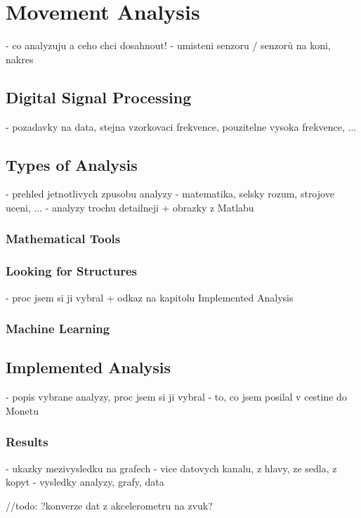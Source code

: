\chapter{Movement Analysis}
- co analyzuju a ceho chci dosahnout!
- umisteni senzoru / senzorů na koni, nakres

\section{Digital Signal Processing}
- pozadavky na data, stejna vzorkovaci frekvence, pouzitelne vysoka frekvence, ...

\section{Types of Analysis}
- prehled jetnotlivych zpusobu analyzy - matematika, selsky rozum, strojove uceni, ...
- analyzy trochu detailneji + obrazky z Matlabu

\subsection{Mathematical Tools}

\subsection{Looking for Structures}
- proc jsem si ji vybral + odkaz na kapitolu Implemented Analysis

\subsection{Machine Learning}

\section{Implemented Analysis}
- popis vybrane analyzy, proc jsem si ji vybral
- to, co jsem posilal v cestine do Monetu

\subsection{Results}
- ukazky mezivysledku na grafech
- vice datovych kanalu, z hlavy, ze sedla, z kopyt
- vysledky analyzy, grafy, data


//todo: ?konverze dat z akcelerometru na zvuk?
